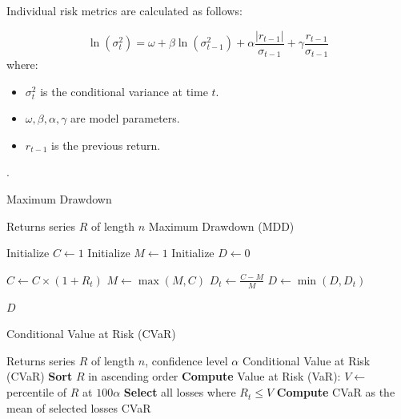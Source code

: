 \documentclass[3p,times,procedia]{elsarticle}
\begin{document}
Individual risk metrics are calculated as follows:

 \cite{Nelson1991}
\begin{equation}
\ln(\sigma_t^2) = \omega + \beta \ln(\sigma_{t-1}^2) + \alpha \frac{|r_{t-1}|}{\sigma_{t-1}} + \gamma \frac{r_{t-1}}{\sigma_{t-1}}
\end{equation}
\vspace{-0.1cm}
where:
\begin{itemize}
    \item $\sigma_t^2$ is the conditional variance at time $t$.
    \item $\omega, \beta, \alpha, \gamma$ are model parameters.
    \item $r_{t-1}$ is the previous return.
\end{itemize}

 \cite{Jorion2001}.

\begin{algorithm}
\caption{Maximum Drawdown}
\label{alg:max_drawdown}
\begin{algorithmic}[1]
    \Require Returns series \( R \) of length \( n \)
    \Ensure Maximum Drawdown (MDD)
    
    \State Initialize \( C \gets 1 \) 
    \State Initialize \( M \gets 1 \) 
    \State Initialize \( D \gets 0 \) 

        \State \( C \gets C \times (1 + R_t) \) 
        \State \( M \gets \max(M, C) \) 
        \State \( D_t \gets \frac{C - M}{M} \) 
        \State \( D \gets \min(D, D_t) \) 
    \EndFor

    \State \Return \( D \)
\end{algorithmic}
\end{algorithm}

\vspace{1cm}

\begin{algorithm}
\caption{Conditional Value at Risk (CVaR)}
\label{alg:cvar}
\begin{algorithmic}[1]
    \Require Returns series $R$ of length $n$, confidence level $\alpha$
    \Ensure Conditional Value at Risk (CVaR)
    \State \textbf{Sort} $R$ in ascending order 
    \State \textbf{Compute} Value at Risk (VaR): $V \gets$ percentile of $R$ at $100\alpha$
    \State \textbf{Select} all losses where $R_t \leq V$
    \State \textbf{Compute} CVaR as the mean of selected losses
    \State \Return CVaR
\end{algorithmic}
\end{algorithm}
\end{document}
